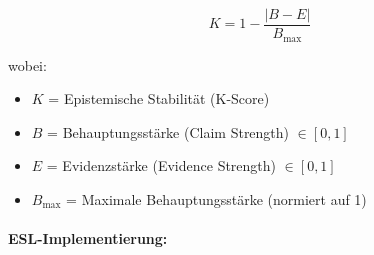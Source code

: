 \begin{equation}
K = 1 - \frac{|B - E|}{B_{\max}}
\end{equation}

wobei:
\begin{itemize}
    \item $K$ = Epistemische Stabilität (K-Score)
    \item $B$ = Behauptungsstärke (Claim Strength) $\in [0, 1]$
    \item $E$ = Evidenzstärke (Evidence Strength) $\in [0, 1]$
    \item $B_{\max}$ = Maximale Behauptungsstärke (normiert auf 1)
\end{itemize}

\paragraph{ESL-Implementierung:}

